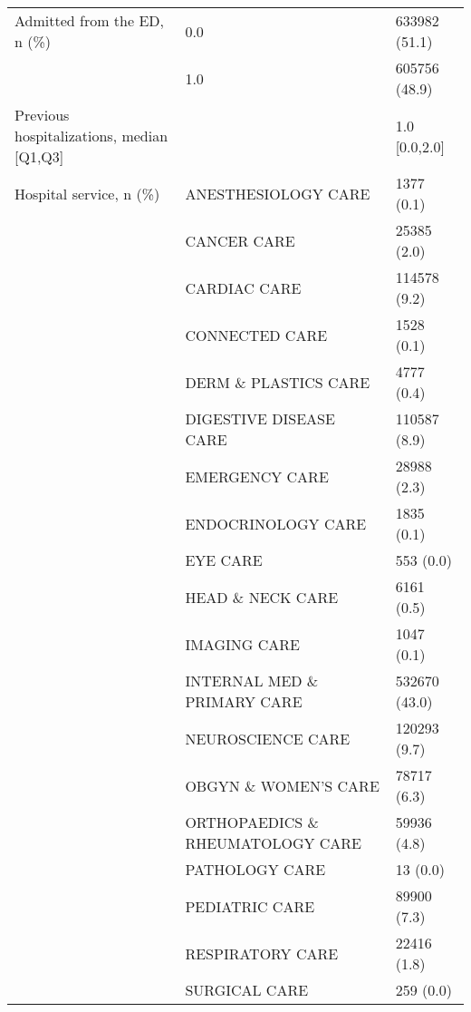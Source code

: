 \begin{tabular}{lll}
Admitted from the ED, n (\%) & 0.0 &      633982 (51.1) \\
                                       & 1.0 &      605756 (48.9) \\
Previous hospitalizations, median [Q1,Q3] &   &      1.0 [0.0,2.0] \\
Hospital service, n (\%) & ANESTHESIOLOGY CARE &         1377 (0.1) \\
                                       & CANCER CARE &        25385 (2.0) \\
                                       & CARDIAC CARE &       114578 (9.2) \\
                                       & CONNECTED CARE &         1528 (0.1) \\
                                       & DERM \& PLASTICS CARE &         4777 (0.4) \\
                                       & DIGESTIVE DISEASE CARE &       110587 (8.9) \\
                                       & EMERGENCY CARE &        28988 (2.3) \\
                                       & ENDOCRINOLOGY CARE &         1835 (0.1) \\
                                       & EYE CARE &          553 (0.0) \\
                                       & HEAD \& NECK CARE &         6161 (0.5) \\
                                       & IMAGING CARE &         1047 (0.1) \\
                                       & INTERNAL MED \& PRIMARY CARE &      532670 (43.0) \\
                                       & NEUROSCIENCE CARE &       120293 (9.7) \\
                                       & OBGYN \& WOMEN'S CARE &        78717 (6.3) \\
                                       & ORTHOPAEDICS \& RHEUMATOLOGY CARE &        59936 (4.8) \\
                                       & PATHOLOGY CARE &           13 (0.0) \\
                                       & PEDIATRIC CARE &        89900 (7.3) \\
                                       & RESPIRATORY CARE &        22416 (1.8) \\
                                       & SURGICAL CARE &          259 (0.0) \\

\end{tabular}
